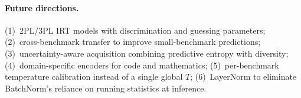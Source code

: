 \documentclass{article}
\begin{document}
\paragraph{Future directions.}
(1)~2PL/3PL IRT models with discrimination and guessing parameters;
(2)~cross-benchmark transfer to improve small-benchmark predictions;
(3)~uncertainty-aware acquisition combining predictive entropy with diversity;
(4)~domain-specific encoders for code and mathematics;
(5)~per-benchmark temperature calibration instead of a single global $T$;
(6)~LayerNorm to eliminate BatchNorm's reliance on running statistics at inference.
\end{document}
